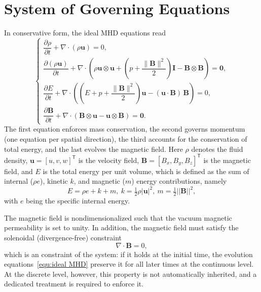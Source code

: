 \documentclass[a4paper,fleqn]{cas-sc}
\theoremstyle{definition}
\theoremstyle{remark}
\begin{document}
\section{System of Governing Equations}
\label{sec:governing}
In conservative form, the ideal MHD equations read
\begin{equation}
\renewcommand{\arraystretch}{1.6}
\label{equ:ideal MHD}
\begin{cases}
\dfrac{\partial \rho}{\partial t}
+ \nabla \cdot (\rho \mathbf{u}) = 0, \\
\dfrac{\partial (\rho \mathbf{u})}{\partial t}
+ \nabla \cdot \left( \rho \mathbf{u} \otimes \mathbf{u}
+ \left( p + \dfrac{\|\mathbf{B}\|^2}{2} \right)\mathbf{I}
- \mathbf{B} \otimes \mathbf{B} \right) = \mathbf{0}, \\
\dfrac{\partial E}{\partial t}
+ \nabla \cdot \left( \left( E + p + \dfrac{\|\mathbf{B}\|^2}{2} \right)\mathbf{u}
- (\mathbf{u}\cdot\mathbf{B})\,\mathbf{B} \right) = 0, \\
\dfrac{\partial \mathbf{B}}{\partial t}
+ \nabla \cdot \left( \mathbf{B} \otimes \mathbf{u}
- \mathbf{u} \otimes \mathbf{B} \right) = \mathbf{0}.
\end{cases}
\end{equation}
The first equation enforces mass conservation, the second governs momentum 
(one equation per spatial direction), the third accounts for the conservation 
of total energy, and the last evolves the magnetic field. Here $\rho$ denotes 
the fluid density, $\mathbf{u} = [u, v, w]^{\mathsf T}$ is the velocity 
field, $\mathbf{B} = [B_x, B_y, B_z]^{\mathsf T}$ is the magnetic field, and 
$E$ is the total energy per unit volume, which is defined as the sum of
internal ($\rho e$), kinetic $k$, and magnetic ($m$) energy contributions, namely
\begin{equation}
\label{equ:defofU}
E = \rho e + k + m, \ k = \tfrac{1}{2}\rho |\mathbf{u}|^2, \ m =  \tfrac{1}{2}||\mathbf{B}||^2,
\end{equation}
with $e$ being the specific internal energy. 

The magnetic field is nondimensionalized such that the vacuum magnetic 
permeability is set to unity. In addition, the magnetic field must satisfy the 
solenoidal (divergence-free) constraint
\begin{equation}
\label{equ:divB}
\nabla \cdot \mathbf{B} = 0,
\end{equation}
which is an constraint of the system: if it holds at the initial time, the 
evolution equations~\eqref{equ:ideal MHD} preserve it for all later times 
at the continuous level. At the discrete level, however, this property 
is not automatically inherited, and a dedicated treatment is required to enforce 
it.
\end{document}
